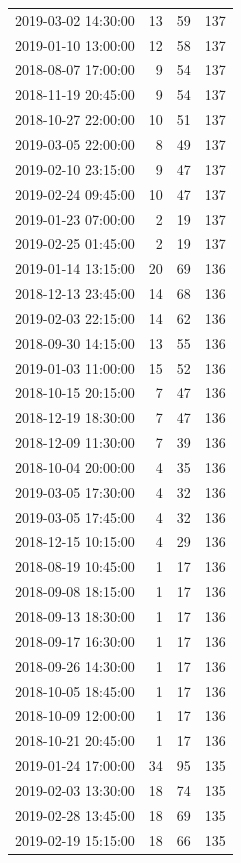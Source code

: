 \begin{tabular}{lrrr}
2019-03-02 14:30:00 & 13 & 59 & 137 \\
2019-01-10 13:00:00 & 12 & 58 & 137 \\
2018-08-07 17:00:00 & 9 & 54 & 137 \\
2018-11-19 20:45:00 & 9 & 54 & 137 \\
2018-10-27 22:00:00 & 10 & 51 & 137 \\
2019-03-05 22:00:00 & 8 & 49 & 137 \\
2019-02-10 23:15:00 & 9 & 47 & 137 \\
2019-02-24 09:45:00 & 10 & 47 & 137 \\
2019-01-23 07:00:00 & 2 & 19 & 137 \\
2019-02-25 01:45:00 & 2 & 19 & 137 \\
2019-01-14 13:15:00 & 20 & 69 & 136 \\
2018-12-13 23:45:00 & 14 & 68 & 136 \\
2019-02-03 22:15:00 & 14 & 62 & 136 \\
2018-09-30 14:15:00 & 13 & 55 & 136 \\
2019-01-03 11:00:00 & 15 & 52 & 136 \\
2018-10-15 20:15:00 & 7 & 47 & 136 \\
2018-12-19 18:30:00 & 7 & 47 & 136 \\
2018-12-09 11:30:00 & 7 & 39 & 136 \\
2018-10-04 20:00:00 & 4 & 35 & 136 \\
2019-03-05 17:30:00 & 4 & 32 & 136 \\
2019-03-05 17:45:00 & 4 & 32 & 136 \\
2018-12-15 10:15:00 & 4 & 29 & 136 \\
2018-08-19 10:45:00 & 1 & 17 & 136 \\
2018-09-08 18:15:00 & 1 & 17 & 136 \\
2018-09-13 18:30:00 & 1 & 17 & 136 \\
2018-09-17 16:30:00 & 1 & 17 & 136 \\
2018-09-26 14:30:00 & 1 & 17 & 136 \\
2018-10-05 18:45:00 & 1 & 17 & 136 \\
2018-10-09 12:00:00 & 1 & 17 & 136 \\
2018-10-21 20:45:00 & 1 & 17 & 136 \\
2019-01-24 17:00:00 & 34 & 95 & 135 \\
2019-02-03 13:30:00 & 18 & 74 & 135 \\
2019-02-28 13:45:00 & 18 & 69 & 135 \\
2019-02-19 15:15:00 & 18 & 66 & 135 \\

\end{tabular}
